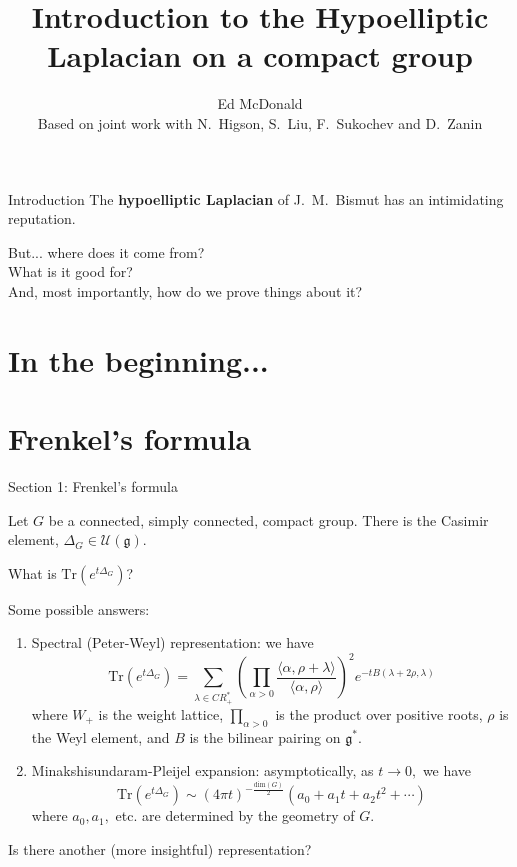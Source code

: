 \documentclass{beamer}
\newcommand\makebeamertitle{\frame{\maketitle}}%
\numberwithin{equation}{section}
\theoremstyle{plain}
\theoremstyle{plain}
\theoremstyle{definition}
\theoremstyle{plain}
\theoremstyle{plain}
\theoremstyle{definition}
\newcommand{\Uc}{\mathcal{U}}
\newcommand{\Tr}{\mathrm{Tr}}
\newcommand{\gf}{\mathfrak{g}}
\begin{document}
\title[Introduction to the Hypoelliptic Laplacian]{Introduction to the Hypoelliptic Laplacian on a compact group}


\author[E. McDonald]{Ed McDonald\\
Based on joint work with N.~Higson, S.~Liu, F.~Sukochev and D.~Zanin}



\makebeamertitle

\begin{frame}{Introduction}
  The \textbf{hypoelliptic Laplacian} of J.~M.~Bismut has an intimidating reputation.
  
  \pause
  But... where does it come from?\\
  \pause
  What is it good for?\\
  \pause
  And, most importantly, how do we prove things about it?
\end{frame}

\section{In the beginning...}


\section{Frenkel's formula}

\begin{frame}
  \huge{Section 1: Frenkel's formula}
\end{frame}

\begin{frame}
  Let $G$ be a connected, simply connected, compact group. There is the Casimir element, $\Delta_G \in \Uc(\gf).$
  
  What is $\Tr(e^{t\Delta_G})$?
  
  Some possible answers:
  \begin{enumerate}
    \item{} Spectral (Peter-Weyl) representation: we have
    \[
        \Tr(e^{t\Delta_G}) = \sum_{\lambda\in CR^*_+} \left(\prod_{\alpha>0} \frac{\langle \alpha,\rho+\lambda\rangle}{\langle \alpha,\rho\rangle}\right)^2e^{-tB(\lambda+2\rho,\lambda)}
    \]
    where $W_+$ is the weight lattice, $\prod_{\alpha>0}$ is the product over positive roots, $\rho$ is the Weyl element, and $B$ is the bilinear pairing on $\gf^*.$
    \item{} Minakshisundaram-Pleijel expansion: asymptotically, as $t\to 0,$ we have
    \[
        \Tr(e^{t\Delta_G}) \sim (4\pi t)^{-\frac{\mathrm{dim}(G)}{2}}(a_0+a_1t+a_2t^2+\cdots)
    \]
    where $a_0, a_1, $ etc. are determined by the geometry of $G.$
  \end{enumerate}
  Is there another (more insightful) representation?
\end{frame}
\end{document}
